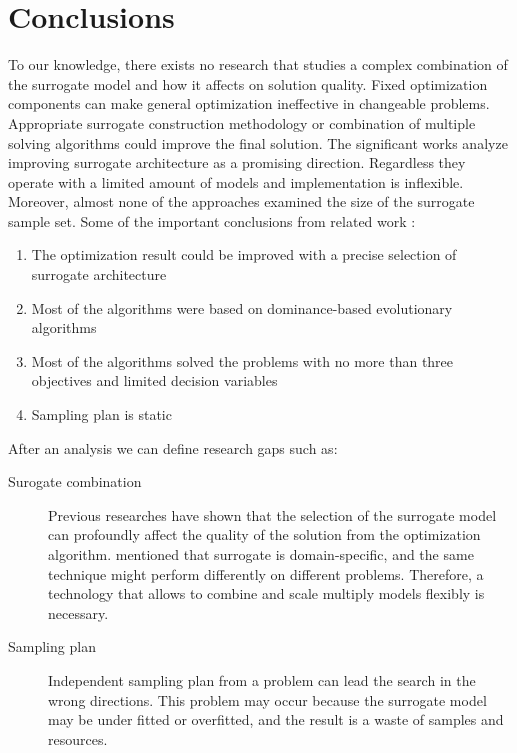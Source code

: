     \section{Conclusions}

        To our knowledge, there exists no research that studies a complex combination of the surrogate model and how it affects on solution quality.  Fixed optimization components can make general optimization ineffective in changeable problems. Appropriate surrogate construction methodology or combination of multiple solving algorithms could improve the final solution. The significant works analyze improving surrogate architecture as a promising direction. Regardless they operate with a limited amount of models and implementation is inflexible. Moreover, almost none of the approaches examined the size of the surrogate sample set. 
        Some of the important conclusions from related work \cite{SoftSurvey}:
        \begin{enumerate}
            \item The optimization result could be improved with a precise selection of surrogate architecture
            \item Most of the algorithms were based on dominance-based evolutionary algorithms
            \item Most of the algorithms solved the problems with no more than three objectives and limited decision variables
            \item Sampling plan is static
        \end{enumerate}


        After an analysis we can define research gaps such as:
        \begin{description}
            \item[Surogate combination] Previous researches have shown that the selection of the surrogate model can profoundly affect the quality of the solution from the optimization algorithm. \cite{LuST19} mentioned that surrogate is domain-specific, and the same technique might perform differently on different problems. Therefore, a technology that allows to combine and scale multiply models flexibly is necessary.
            \item[Sampling plan] Independent sampling plan from a problem can lead the search in the wrong directions. This problem may occur because the surrogate model may be under fitted or overfitted, and the result is a waste of samples and resources.
        \end{description}

